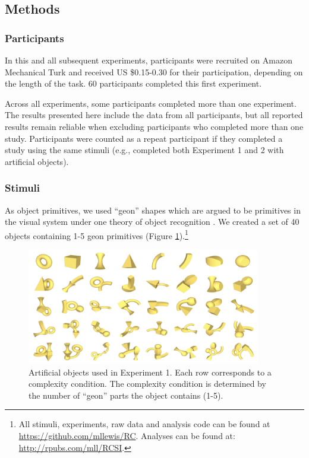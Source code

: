 \documentclass[man]{apa2}
\begin{document}
\subsection{Methods}

\subsubsection{Participants} In this and all subsequent experiments, participants were recruited on Amazon Mechanical Turk and received US \$0.15-0.30 for their participation, depending on the length of the task. 60 participants completed this first experiment. 

Across all experiments, some participants completed more than one experiment. The results presented here include the data from all participants, but all reported results remain reliable when excluding participants who completed more than one study. Participants were counted as a repeat participant if they completed a study using the same stimuli (e.g., completed both Experiment 1 and 2 with artificial objects).

\subsubsection{Stimuli}
As object primitives, we used ``geon'' shapes which are argued to be primitives in the visual system under one theory of object recognition \cite{biederman1987}. We created a set of 40 objects containing 1-5 geon primitives (Figure \ref{fig:geons}).\footnote{All stimuli, experiments, raw data and analysis code can be found at \url{https://github.com/mllewis/RC}. 
Analyses can be found at: \url{http://rpubs.com/mll/RCSI}.} 

\begin{figure} 
 \begin{center} 
  \includegraphics[height=2in]{figures/geon_stimuli.png} 
  \caption{\label{fig:geons} Artificial objects used in Experiment 1. Each row corresponds to a complexity condition. The complexity condition is determined by the number of ``geon'' parts the object contains (1-5). } 
 \end{center} 
\end{figure}	
\end{document}
